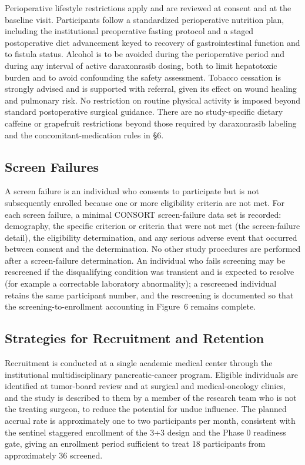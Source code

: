 Perioperative lifestyle restrictions apply and are reviewed at consent and at the
baseline visit. Participants follow a standardized perioperative nutrition plan,
including the institutional preoperative fasting protocol and a staged
postoperative diet advancement keyed to recovery of gastrointestinal function and
to fistula status. Alcohol is to be avoided during the perioperative period and
during any interval of active daraxonrasib dosing, both to limit hepatotoxic
burden and to avoid confounding the safety assessment. Tobacco cessation is
strongly advised and is supported with referral, given its effect on wound healing
and pulmonary risk. No restriction on routine physical activity is imposed beyond
standard postoperative surgical guidance. There are no study-specific dietary
caffeine or grapefruit restrictions beyond those required by daraxonrasib labeling
and the concomitant-medication rules in \S6.

\subsection{Screen Failures}

A screen failure is an individual who consents to participate but is not
subsequently enrolled because one or more eligibility criteria are not met. For
each screen failure, a minimal CONSORT screen-failure data set is recorded:
demography, the specific criterion or criteria that were not met (the
screen-failure detail), the eligibility determination, and any serious adverse
event that occurred between consent and the determination. No other study
procedures are performed after a screen-failure determination. An individual who
fails screening may be rescreened if the disqualifying condition was transient and
is expected to resolve (for example a correctable laboratory abnormality);
a rescreened individual retains the same participant number, and the
rescreening is documented so that the screening-to-enrollment accounting in
Figure~6 remains complete.

\subsection{Strategies for Recruitment and Retention}

Recruitment is conducted at a single academic medical center through the
institutional multidisciplinary pancreatic-cancer program. Eligible individuals
are identified at tumor-board review and at surgical and medical-oncology clinics,
and the study is described to them by a member of the research team who is not the
treating surgeon, to reduce the potential for undue influence. The planned accrual
rate is approximately one to two participants per month, consistent with the
sentinel staggered enrollment of the 3+3 design and the Phase 0 readiness gate,
giving an enrollment period sufficient to treat 18 participants from approximately
36 screened.

